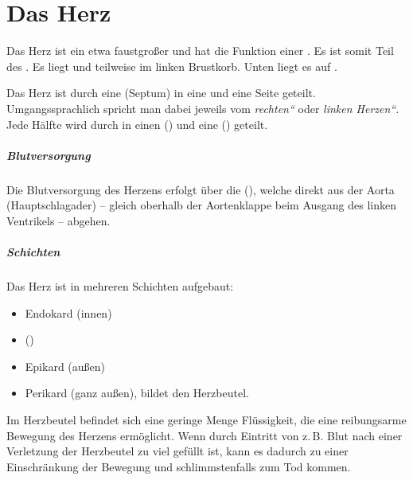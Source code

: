 \bigskip
\section{Das Herz}
 \label{topic:herz}

{%
Das Herz ist ein etwa faustgroßer  und hat die Funktion einer
. Es ist somit Teil des . 
Es liegt 
 und teilweise im linken Brustkorb.
Unten liegt es auf .

Das Herz ist durch eine  (Septum) in eine
 und eine  Seite geteilt.
Umgangssprachlich spricht man dabei jeweils vom
\emph{{\quotedblbase}rechten{\textquotedblleft}} oder
\emph{{\quotedblbase}linken Herzen{\textquotedblleft}}. Jede
Hälfte wird durch  in einen 
() und eine  ()
geteilt.

\subparagraph{Blutversorgung}

Die Blutversorgung des Herzens erfolgt über die
 (), welche direkt aus
der Aorta (Hauptschlagader) -- gleich oberhalb der
Aortenklappe beim Ausgang des linken Ventrikels -- abgehen.

\subparagraph{Schichten}

Das Herz ist in mehreren Schichten aufgebaut:
\begin{itemize}
\item Endokard (innen)      
\item {} ()  
\item Epikard (außen)  
\item Perikard (ganz außen), bildet den Herzbeutel.
\end{itemize}

\noindent Im Herzbeutel befindet sich eine geringe Menge
Flüssigkeit, die eine reibungsarme Bewegung des Herzens
ermöglicht. Wenn durch Eintritt von z.\,B. Blut nach einer
Verletzung der Herzbeutel zu viel gefüllt ist, kann es
dadurch zu einer Einschränkung der Bewegung und
schlimmstenfalls zum Tod kommen.
}
